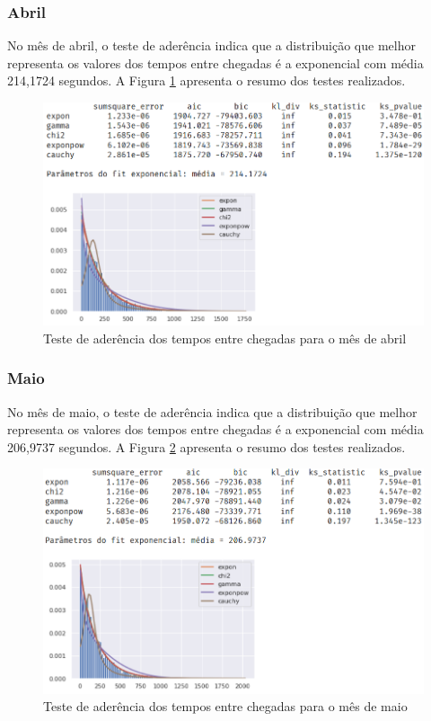 \subsubsection*{Abril}
No mês de abril, o teste de aderência indica que a distribuição que melhor representa os valores dos tempos entre chegadas é a exponencial com média 214,1724 segundos. A Figura \ref*{fig: fit-abril} apresenta o resumo dos testes realizados.

\begin{figure}[H]
    \includegraphics[scale=0.8]{analise-de-dados/fit/fit-abril.png}
    \caption{Teste de aderência dos tempos entre chegadas para o mês de abril}
    \label{fig: fit-abril}
\end{figure}

\subsubsection*{Maio}
No mês de maio, o teste de aderência indica que a distribuição que melhor representa os valores dos tempos entre chegadas é a exponencial com média 206,9737 segundos. A Figura \ref*{fig: fit-maio} apresenta o resumo dos testes realizados.

\begin{figure}[H]
    \includegraphics[scale=0.8]{analise-de-dados/fit/fit-maio.png}
    \caption{Teste de aderência dos tempos entre chegadas para o mês de maio}
    \label{fig: fit-maio}
\end{figure}

